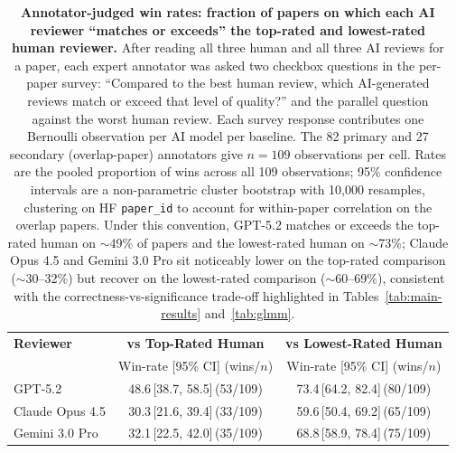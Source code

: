 \begin{table}[t]
\centering
\fontsize{8}{10}\selectfont
\setlength{\tabcolsep}{6pt}
\begin{tabular}{l cc}
\toprule
\textbf{Reviewer} & \textbf{vs Top-Rated Human} & \textbf{vs Lowest-Rated Human} \\
                  & {\scriptsize Win-rate [95\% CI]\,\,(wins/$n$)} & {\scriptsize Win-rate [95\% CI]\,\,(wins/$n$)} \\
\midrule
GPT-5.2         & 48.6{\scriptsize\,[38.7, 58.5]}\,({\scriptsize 53/109}) & 73.4{\scriptsize\,[64.2, 82.4]}\,({\scriptsize 80/109}) \\
Claude Opus 4.5 & 30.3{\scriptsize\,[21.6, 39.4]}\,({\scriptsize 33/109}) & 59.6{\scriptsize\,[50.4, 69.2]}\,({\scriptsize 65/109}) \\
Gemini 3.0 Pro  & 32.1{\scriptsize\,[22.5, 42.0]}\,({\scriptsize 35/109}) & 68.8{\scriptsize\,[58.9, 78.4]}\,({\scriptsize 75/109}) \\
\bottomrule
\end{tabular}
\caption{\textbf{Annotator-judged win rates: fraction of papers on which each AI reviewer ``matches or exceeds'' the top-rated and lowest-rated human reviewer.}
After reading all three human and all three AI reviews for a paper, each expert annotator was asked two checkbox questions in the per-paper survey: ``Compared to the best human review, which AI-generated reviews match or exceed that level of quality?'' and the parallel question against the worst human review.
Each survey response contributes one Bernoulli observation per AI model per baseline.
The 82 primary and 27 secondary (overlap-paper) annotators give $n = 109$ observations per cell.
Rates are the pooled proportion of wins across all 109 observations; 95\% confidence intervals are a non-parametric cluster bootstrap with 10{,}000 resamples, clustering on HF \texttt{paper\_id} to account for within-paper correlation on the overlap papers.
Under this convention, GPT-5.2 matches or exceeds the top-rated human on $\sim$49\% of papers and the lowest-rated human on $\sim$73\%; Claude Opus 4.5 and Gemini 3.0 Pro sit noticeably lower on the top-rated comparison ($\sim$30--32\%) but recover on the lowest-rated comparison ($\sim$60--69\%), consistent with the correctness-vs-significance trade-off highlighted in Tables~\ref{tab:main-results} and~\ref{tab:glmm}.
}
\label{tab:winrate}
\end{table}
